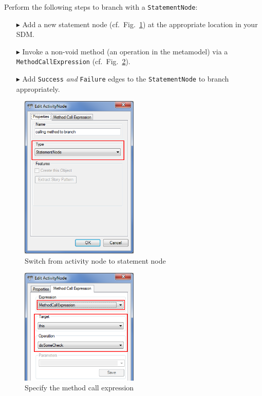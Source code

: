 Perform the following steps to branch with a \texttt{StatementNode}:
\begin{enumerate}
\item[$\blacktriangleright$] Add a new statement node (cf.~Fig.~\ref{fig:cond_statement_node}) at the appropriate location in your SDM.
\item[$\blacktriangleright$] Invoke a non-void method (an operation in the metamodel) via a \texttt{MethodCallExpression} (cf.~Fig.~\ref{fig:cond_method_call}). 
\item[$\blacktriangleright$] Add \texttt{Success} \emph{and} \texttt{Failure} edges to the \texttt{StatementNode} to branch appropriately.
\end{enumerate}

\begin{figure}[htbp]
\begin{center}
  \includegraphics[width=0.5\textwidth]{pics/advancedTopics/branching/01_switch_to_statement_node}
  \caption{Switch from activity node to statement node}
  \label{fig:cond_statement_node}
\end{center}
\end{figure}

\begin{figure}[htbp]
\begin{center}
  \includegraphics[width=0.5\textwidth]{pics/advancedTopics/branching/02_specify_method_call_expression}
  \caption{Specify the method call expression}
  \label{fig:cond_method_call}
\end{center}
\end{figure}
\clearpage